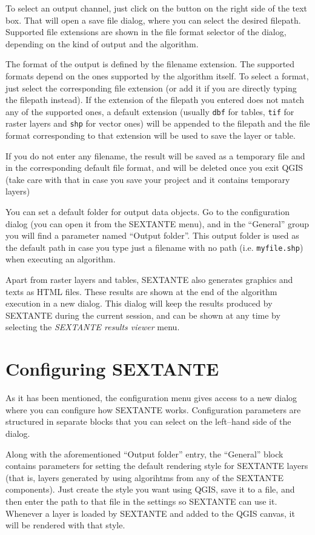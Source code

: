 To select an output channel, just click on the button on the right side of the text box. That will open a save file dialog, where you can select the desired filepath. Supported file extensions are shown in the file format selector of the dialog, depending on the kind of output and the algorithm.

The format of the output is defined by the filename extension. The supported formats depend on the ones supported by the algorithm itself. To select a format, just select the corresponding file extension (or add it if you are directly typing the filepath instead). If the extension of the filepath you entered does not match any of the supported ones, a default extension (usually \texttt{dbf} for tables, \texttt{tif} for raster layers and \texttt{shp} for vector ones) will be appended to the filepath and the file format corresponding to that extension will be used to save the layer or table.

If you do not enter any filename, the result will be saved as a temporary file and in the corresponding default file format, and will be deleted once you exit QGIS (take care with that in case you save your project and it contains temporary layers)

You can set a default folder for output data objects. Go to the configuration dialog (you can open it from the SEXTANTE menu), and in the ``General'' group you will find a parameter named ``Output folder''. This output folder is used as the default path in case you type just a filename with no path (i.e. \texttt{myfile.shp}) when executing an algorithm. 

Apart from raster layers and tables, SEXTANTE also generates graphics and texts as HTML files. These results are shown at the end of the algorithm execution in a new dialog. This dialog will keep the results produced by SEXTANTE during the current session, and can be shown at any time by selecting the \emph{SEXTANTE results viewer} menu.

\section{Configuring SEXTANTE}

As it has been mentioned, the configuration menu gives access to a new dialog where you can configure how SEXTANTE works. Configuration parameters are structured in separate blocks that you can select on the left--hand side of the dialog.

Along with the aforementioned ``Output folder'' entry, the ``General'' block contains parameters for setting the default rendering style for SEXTANTE layers (that is, layers generated by using algorihtms from any of the SEXTANTE components). Just create the style you want using QGIS, save it to a file, and then enter the path to that file in the settings so SEXTANTE can use it. Whenever a layer is loaded by SEXTANTE and added to the QGIS canvas, it will be rendered with that style.

